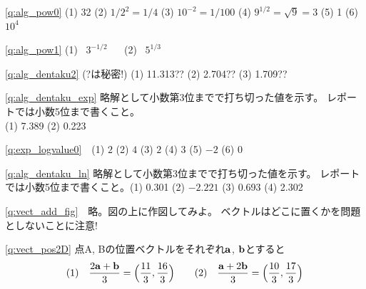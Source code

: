\ref{q:alg_pow0} (1) 32 (2) $1/2^2= 1/4$ (3) $10^{-2} = 1/100$
(4) $9^{1/2} = \sqrt{9} = 3$ (5) 1 (6) $10^4$\mv

\ref{q:alg_pow1} (1) $\,\,\,3^{-1/2}\,\,\,\,\,\,\,\,$ (2) $\,\,\,5^{1/3}$
\mv

\ref{q:alg_dentaku2} (?は秘密!) (1) 11.313?? (2) 2.704?? (3) 1.709??\mv


\ref{q:alg_dentaku_exp} 略解として小数第3位までで打ち切った値を示す。
レポートでは小数5位まで書くこと。\\(1) 7.389 (2) 0.223\mv

\ref{q:exp_logvalue0}　(1) $2$ (2) $4$ (3) $2$ (4) $3$ (5) $-2$ (6) $0$\mv


\ref{q:alg_dentaku_ln} 
略解として小数第3位までで打ち切った値を示す。
レポートでは小数5位まで書くこと。(1) 0.301 (2) $-2.221$ (3) 0.693 (4) 2.302\mv


\ref{q:vect_add_fig}　略。図の上に作図してみよ。
ベクトルはどこに置くかを問題としないことに注意!
\mv

\ref{q:vect_pos2D}  点A, Bの位置ベクトルをそれぞれ${\bf a}$, ${\bf b}$とすると
\begin{eqnarray*}\text(1)\quad\frac{2{\bf a}+{\bf b}}{3}=\Bigl(\frac{11}{3}, \frac{16}{3}\Bigr)\quad\quad
                 \text(2)\quad\frac{{\bf a}+2{\bf b}}{3}=\Bigl(\frac{10}{3}, \frac{17}{3}\Bigr)\end{eqnarray*}

